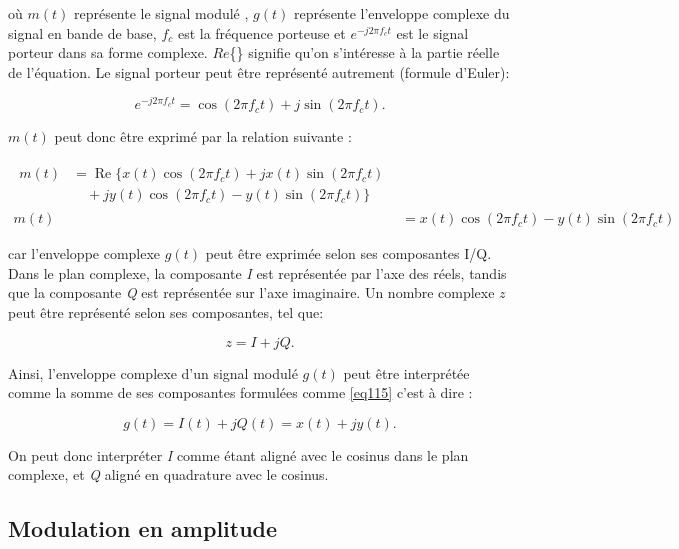 où $m(t)$ représente le signal modulé , $g(t)$ représente l'enveloppe complexe du signal en bande de base, $f_c$ est la fréquence porteuse et $e^{-j2\pi f_c t}$ est le signal porteur dans sa forme complexe. $Re$\{\} signifie qu'on s'intéresse à la partie réelle de l'équation. Le signal porteur peut être représenté autrement (formule d'Euler):

\begin{equation}\label{eq111}
e^{-j2\pi f_c t} = \cos(2 \pi f_c t) + j \sin(2 \pi f_c t).
\end{equation}

$m(t)$ peut donc être exprimé par la relation suivante :

\begin{align}
    \begin{split}
    m(t) &= \operatorname{Re} \{ x(t) \cos(2 \pi f_c t) + j x(t) \sin(2 \pi f_c t) \\
         &\quad + j y(t) \cos(2 \pi f_c t) - y(t) \sin(2 \pi f_c t)\}
    \end{split} \\
    m(t) &= x(t) \cos(2 \pi f_c t) - y(t) \sin(2 \pi f_c t)
\end{align}

car l'enveloppe complexe $g(t)$ peut être exprimée selon ses composantes \ac{I/Q}. Dans le plan complexe, la composante \textit{I} est représentée par l'axe des réels, tandis que la composante \textit{Q} est représentée sur l'axe imaginaire. Un nombre complexe $z$ peut être représenté selon ses composantes, tel que:

\begin{equation}\label{eq115}
z = I + jQ.
\end{equation}

Ainsi, l'enveloppe complexe d'un signal modulé $g(t)$ peut être interprétée comme la somme de ses composantes formulées comme \ref{eq115} c'est à dire :

\begin{equation}\label{eq116}
g(t) = I(t) + jQ(t) = x(t) + jy(t).
\end{equation}

On peut donc interpréter \textit{I} comme étant aligné avec le cosinus dans le plan complexe, et \textit{Q} aligné en quadrature avec le cosinus.

\subsection{Modulation en amplitude}

